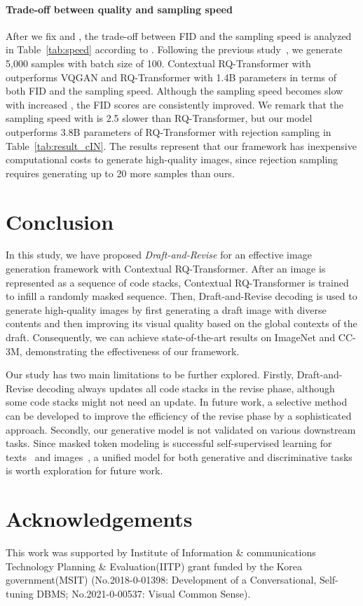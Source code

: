 \documentclass{article}
\newcommand{\ARmodel}{Contextual RQ-Transformer }
\begin{document}
\paragraph{Trade-off between quality and sampling speed}
After we fix  and , the trade-off between FID and the sampling speed is analyzed in Table~\ref{tab:speed} according to .
Following the previous study~\cite{RQVAE}, we generate 5,000 samples with batch size of 100.
\ARmodel with  outperforms VQGAN and RQ-Transformer with 1.4B parameters in terms of both FID and the sampling speed.
Although the sampling speed becomes slow with increased , the FID scores are consistently improved.
We remark that the sampling speed with  is 2.5 slower than RQ-Transformer, but our model outperforms 3.8B parameters of RQ-Transformer with rejection sampling in Table~\ref{tab:result_cIN}.
The results represent that our framework has inexpensive computational costs to generate high-quality images, since rejection sampling requires generating up to 20 more samples than ours.

\section{Conclusion} \label{sec:conclusion}
In this study, we have proposed \emph{Draft-and-Revise} for an effective image generation framework with Contextual RQ-Transformer.
After an image is represented as a sequence of code stacks, Contextual RQ-Transformer is trained to infill a randomly masked sequence.
Then, Draft-and-Revise decoding is used to generate high-quality images by first generating a draft image with diverse contents and then improving its visual quality based on the global contexts of the draft.
Consequently, we can achieve state-of-the-art results on ImageNet and CC-3M, demonstrating the effectiveness of our framework.

Our study has two main limitations to be further explored.
Firstly, Draft-and-Revise decoding always updates all code stacks in the revise phase, although some code stacks might not need an update.
In future work, a selective method can be developed to improve the efficiency of the revise phase by a sophisticated approach.
Secondly, our generative model is not validated on various downstream tasks.
Since masked token modeling is successful self-supervised learning for texts~\cite{BERT} and images~\cite{BeiT,MAE}, a unified model for both generative and discriminative tasks~\cite{GCRL} is worth exploration for future work.

\section{Acknowledgements}
This work was supported by Institute of Information \& communications Technology Planning \& Evaluation(IITP) grant funded by the Korea government(MSIT) (No.2018-0-01398: Development of a Conversational, Self-tuning DBMS; No.2021-0-00537: Visual Common Sense).
\end{document}
